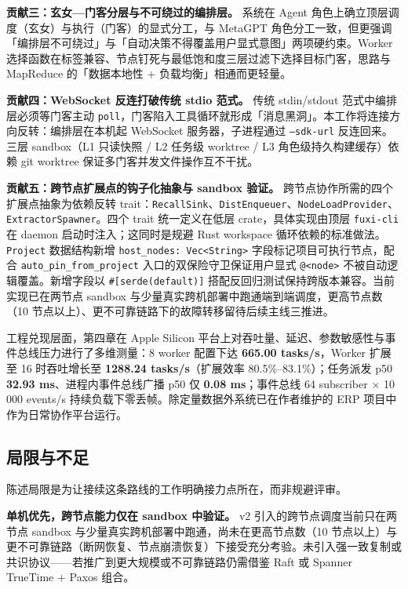 \textbf{贡献三：玄女—门客分层与不可绕过的编排层。} 系统在 Agent 角色上确立顶层调度（玄女）与执行（门客）的显式分工，与 MetaGPT\parencite{hong2023metagpt} 角色分工一致，但更强调「编排层不可绕过」与「自动决策不得覆盖用户显式意图」两项硬约束。Worker 选择函数在标签兼容、节点钉死与最低饱和度三层过滤下选择目标门客，思路与 MapReduce\parencite{dean2004mapreduce} 的「数据本地性 + 负载均衡」相通而更轻量。

\textbf{贡献四：WebSocket 反连打破传统 stdio 范式。} 传统 stdin/stdout 范式中编排层必须等门客主动 \texttt{poll}，门客陷入工具循环就形成「消息黑洞」。本工作将连接方向反转：编排层在本机起 WebSocket 服务器\parencite{fette2011websocket}，子进程通过 \texttt{--sdk-url} 反连回来。三层 sandbox（L1 只读快照 / L2 任务级 worktree / L3 角色级持久构建缓存）依赖 git worktree\parencite{git2024worktree} 保证多门客并发文件操作互不干扰。

\textbf{贡献五：跨节点扩展点的钩子化抽象与 sandbox 验证。} 跨节点协作所需的四个扩展点抽象为依赖反转 trait：\texttt{RecallSink}、\texttt{DistEnqueuer}、\texttt{NodeLoadProvider}、\texttt{ExtractorSpawner}。四个 trait 统一定义在低层 crate，具体实现由顶层 \texttt{fuxi-cli} 在 daemon 启动时注入；这同时是规避 Rust workspace 循环依赖的标准做法。\texttt{Project} 数据结构新增 \texttt{host\_nodes: Vec<String>} 字段标记项目可执行节点，配合 \texttt{auto\_pin\_from\_project} 入口的双保险守卫保证用户显式 \texttt{@<node>} 不被自动逻辑覆盖。新增字段以 \texttt{\#[serde(default)]} 搭配反回归测试保持跨版本兼容。当前实现已在两节点 sandbox 与少量真实跨机部署中跑通端到端调度，更高节点数（10 节点以上）、更不可靠链路下的故障转移留待后续主线三推进。

工程兑现层面，第四章在 Apple Silicon 平台上对吞吐量、延迟、参数敏感性与事件总线压力进行了多维测量：8 worker 配置下达 \textbf{665.00 tasks/s}，Worker 扩展至 16 时吞吐增长至 \textbf{1288.24 tasks/s}（扩展效率 80.5\%--83.1\%）；任务派发 p50 \textbf{32.93 ms}、进程内事件总线广播 p50 仅 \textbf{0.08 ms}；事件总线 64 subscriber × 10\,000 events/s 持续负载下零丢帧。除定量数据外系统已在作者维护的 ERP 项目中作为日常协作平台运行。

\subsection{局限与不足}
\label{subsec:limitations}

陈述局限是为让接续这条路线的工作明确接力点所在，而非规避评审。

\textbf{单机优先，跨节点能力仅在 sandbox 中验证。} v2 引入的跨节点调度当前只在两节点 sandbox 与少量真实跨机部署中跑通，尚未在更高节点数（10 节点以上）与更不可靠链路（断网恢复、节点崩溃恢复）下接受充分考验。未引入强一致复制或共识协议——若推广到更大规模或不可靠链路仍需借鉴 Raft\parencite{ongaro2014raft} 或 Spanner TrueTime + Paxos 组合\parencite{corbett2012spanner}。

